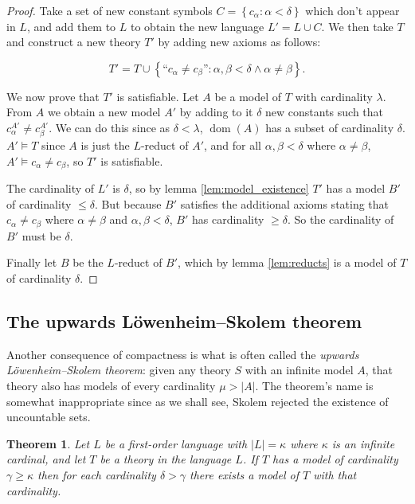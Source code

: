 \documentclass[10pt, a4paper, oneside]{article}
\newtheorem{thm}{Theorem}[section]
\theoremstyle{definition}
\theoremstyle{remark}
\theoremstyle{plain}
\theoremstyle{plain}
\DeclareMathOperator{\dom}{dom}
\begin{document}
\begin{proof}
    Take a set of new constant symbols $C = \left\{ c_\alpha : \alpha < \delta
    \right\}$ which don't appear in $L$, and add them to $L$ to obtain the new
    language $L' = L \cup C$. We then take $T$ and construct a new theory $T'$
    by adding new axioms as follows:
    
    \begin{equation}
        T' = T \cup \left\{
            \text{``$c_\alpha \neq c_\beta$''}
            :
            \alpha, \beta < \delta \wedge \alpha \neq \beta
        \right\}.
    \end{equation}
    
    We now prove that $T'$ is satisfiable. Let $A$ be a model of $T$ with
    cardinality $\lambda$. From $A$ we obtain a new model $A'$ by adding to it
    $\delta$ new constants such that $c_\alpha^{A'} \neq c_\beta^{A'}$. We can
    do this since as $\delta < \lambda$, $\dom(A)$ has a subset of cardinality
    $\delta$. $A' \models T$ since $A$ is just the $L$-reduct of $A'$, and for
    all $\alpha, \beta < \delta$ where $\alpha \neq \beta$,
    $A' \models c_\alpha \neq c_\beta$, so $T'$ is satisfiable.
    
    The cardinality of $L'$ is $\delta$, so by lemma \ref{lem:model_existence}
    $T'$ has a model $B'$ of cardinality $\leq \delta$. But because $B'$
    satisfies the additional axioms stating that $c_\alpha \neq c_\beta$ where
    $\alpha \neq \beta$ and $\alpha, \beta < \delta$, $B'$ has cardinality
    $\geq \delta$. So the cardinality of $B'$ must be $\delta$.
    
    Finally let $B$ be the $L$-reduct of $B'$, which by lemma \ref{lem:reducts}
    is a model of $T$ of cardinality $\delta$.
\end{proof}

\subsection{The upwards Löwenheim--Skolem theorem}

Another consequence of compactness is what is often called the \emph{upwards
Löwenheim--Skolem theorem}: given any theory $S$ with an infinite model $A$,
that theory also has models of every cardinality $\mu > |A|$. The theorem's
name is somewhat inappropriate since as we shall see, Skolem rejected the
existence of uncountable sets.

\begin{thm}
    Let $L$ be a first-order language with $|L| = \kappa$ where $\kappa$ is an
    infinite cardinal, and let $T$ be a theory in the language $L$. If $T$ has a
    model of cardinality $\gamma \geq \kappa$ then for each cardinality
    $\delta > \gamma$ there exists a model of $T$ with that cardinality.
\end{thm}
\end{document}
